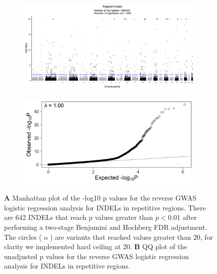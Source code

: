 \documentclass[custompaper]{MBE}%
\begin{document}
\begin{figure} \centering
    \begin{subfigure}[b]{\linewidth}
        \includegraphics[width=\hsize]{./Figures/ManhattanPlot_RepeatIndels.jpg}
        \label{fig:a}
    \end{subfigure} %

    \begin{subfigure}[b]{\linewidth}
    	\center    
        \includegraphics[width=\hsize]{./Figures/QQPlot_RepeatIndels.jpg}
        \label{fig:b}    
    \end{subfigure} 
    \caption{\textbf{A} Manhattan plot of the -log10 p values for the reverse GWAS logistic regression analysis for INDELs in repetitive regions. There are 642 INDELs that reach p values greater than $ p < 0.01$ after performing a two-stage Benjamini and Hochberg FDR adjustment.  The circles ( o ) are variants that reached values greater than 20, for clarity we implemented hard ceiling at 20. 
  \textbf{B} QQ plot of the unadjusted p values for the reverse GWAS logistic regression analysis for INDELs in repetitive regions.}
  \label{RI_Manhattan}
  \end{figure}
\end{document}
